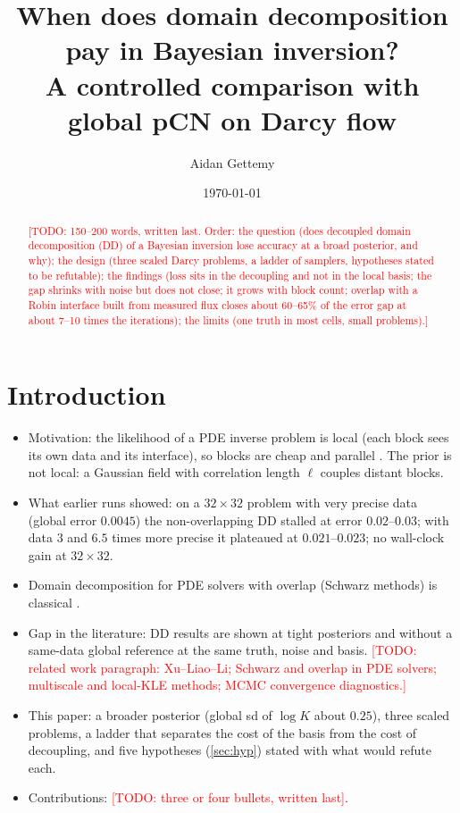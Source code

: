 \documentclass[11pt]{article}
\title{When does domain decomposition pay in Bayesian inversion?\\
A controlled comparison with global pCN on Darcy flow}
\author{Aidan Gettemy \and \todo{co-authors}}
\date{\today}
\newcommand{\todo}[1]{\textcolor{red}{[TODO: #1]}}
\newcommand{\needsource}[1]{\iftoggle{annotations}{\textbf{\textcolor{annorange}{[Source needed\ifx\relax#1\relax\else: #1\fi]}}}{}}
\begin{document}
\maketitle

\begin{abstract}
\todo{150--200 words, written last. Order: the question (does decoupled domain decomposition (DD) of a Bayesian inversion lose accuracy at a broad posterior, and why); the design (three scaled Darcy problems, a ladder of samplers, hypotheses stated to be refutable); the findings (loss sits in the decoupling and not in the local basis; the gap shrinks with noise but does not close; it grows with block count; overlap with a Robin interface built from measured flux closes about 60--65\% of the error gap at about 7--10 times the iterations); the limits (one truth in most cells, small problems).}
\end{abstract}

\section{Introduction}\label{sec:intro}
\begin{itemize}
\item Motivation: the likelihood of a PDE inverse problem is local (each block sees its own data and its interface), so blocks are cheap and parallel \citep{XuLiaoLi2022}. The prior is not local: a Gaussian field with correlation length $\ell$ couples distant blocks.
\item What earlier runs showed: on a $32\times32$ problem with very precise data (global error $0.0045$) the non-overlapping DD stalled at error $0.02$--$0.03$; with data $3$ and $6.5$ times more precise it plateaued at $0.021$--$0.023$; no wall-clock gain at $32\times32$.
\item Domain decomposition for PDE solvers with overlap (Schwarz methods) is classical \needsource{Schwarz methods reference}.
\item Gap in the literature: DD results are shown at tight posteriors and without a same-data global reference at the same truth, noise and basis. \todo{related work paragraph: Xu--Liao--Li; Schwarz and overlap in PDE solvers; multiscale and local-KLE methods; MCMC convergence diagnostics.}
\item This paper: a broader posterior (global sd of $\log K$ about $0.25$), three scaled problems, a ladder that separates the cost of the basis from the cost of decoupling, and five hypotheses (\cref{sec:hyp}) stated with what would refute each.
\item Contributions: \todo{three or four bullets, written last}.
\end{itemize}
\end{document}
